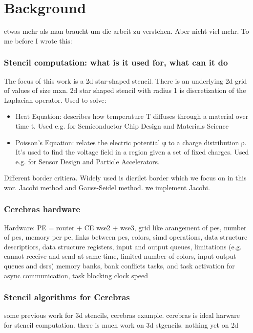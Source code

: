 \chapter{Background}
etwas mehr als man braucht um die arbeit zu verstehen. Aber nicht viel mehr.
To me before I wrote this:
\subsection{Stencil computation: what is it used for, what can it do}
The focus of this work is a 2d star-shaped stencil. There is an underlying 2d grid of values of size mxn.  
2d star shaped stencil with radius 1 is discretization of the Laplacian operator.
Used to solve:
\begin{itemize}
    \item Heat Equation: describes how temperature T diffuses through a material over time t. Used e.g. for Semiconductor Chip Design and Materials Science
    \item Poisson's Equation: relates the electric potential φ to a charge distribution ρ. It's used to find the voltage field in a region given a set of fixed charges. Used e.g. for Sensor Design and Particle Accelerators.
\end{itemize}
Different border critiera. Widely used is dicrilet border which we focus on in this wor.
Jacobi method and Gauss-Seidel method. we implement Jacobi.
\subsection{Cerebras hardware}
Hardware: PE = router + CE
wse2 + wse3, grid like arangement of pes, number of pes, memory per pe, links between pes, colors, simd operations, data structure descriptiors, data structure registers, input and output queues, limitations (e.g. cannot receive and send at same time, limited number of colors, input output queues and dsrs)
memory banks, bank conflicts
tasks, and task activation for async communication, task blocking
clock speed
\subsection{Stencil algorithms for Cerebras}
some previous work for 3d stencils, cerebras example.
cerebras is ideal harware for stencil computation. 
there is much work on 3d stgencils. nothing yet on 2d 